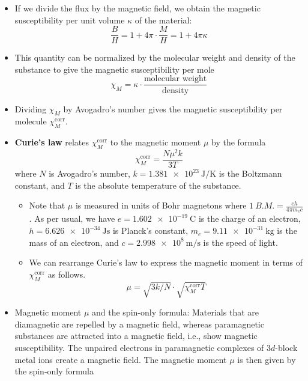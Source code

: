 \documentclass[../notes.tex]{subfiles}
\begin{document}
\begin{itemize}
\begin{itemize}
        \item If we divide the flux by the magnetic field, we obtain the magnetic susceptibility per unit volume $\kappa$ of the material:
        \begin{equation*}
            \frac{B}{H} = 1+4\pi\cdot\frac{M}{H} = 1+4\pi\kappa
        \end{equation*}
        \item This quantity can be normalized by the molecular weight and density of the substance to give the magnetic susceptibility per mole
        \begin{equation*}
            \chi_M = \kappa\cdot\frac{\text{molecular weight}}{\text{density}}
        \end{equation*}
        \item Dividing $\chi_M$ by Avogadro's number gives the magnetic susceptibility per molecule $\chi_M^\text{corr}$.
        \item \textbf{Curie's law} relates $\chi_M^\text{corr}$ to the magnetic moment $\mu$ by the formula
        \begin{equation*}
            \chi_M^\text{corr} = \frac{N\mu^2k}{3T}
        \end{equation*}
        where $N$ is Avogadro's number, $k=\SI[per-mode=symbol]{1.381e23}{\joule\per\kelvin}$ is the Boltzmann constant, and $T$ is the absolute temperature of the substance.
        \begin{itemize}
            \item Note that $\mu$ is measured in units of Bohr magnetons where $\SI{1}{B.M.}=\frac{eh}{4\pi m_ec}$. As per usual, we have $e=\SI{1.602e-19}{\coulomb}$ is the charge of an electron, $h=\SI{6.626e-34}{\joule\second}$ is Planck's constant, $m_e=\SI{9.11e-31}{\kilo\gram}$ is the mass of an electron, and $c=\SI[per-mode=symbol]{2.998e8}{\meter\per\second}$ is the speed of light.
            \item We can rearrange Curie's law to express the magnetic moment in terms of $\chi_M^\text{corr}$ as follows.
            \begin{equation*}
                \mu = \sqrt{3k/N}\cdot\sqrt{\chi_M^\text{corr}T}
            \end{equation*}
        \end{itemize}
        \item Magnetic moment $\mu$ and the spin-only formula: Materials that are diamagnetic are repelled by a magnetic field, whereas paramagnetic substances are attracted into a magnetic field, i.e., show magnetic susceptibility. The unpaired electrons in paramagnetic complexes of $3d$-block metal ions create a magnetic field. The magnetic moment $\mu$ is then given by the spin-only formula

\end{itemize}
\end{itemize}
\end{document}
